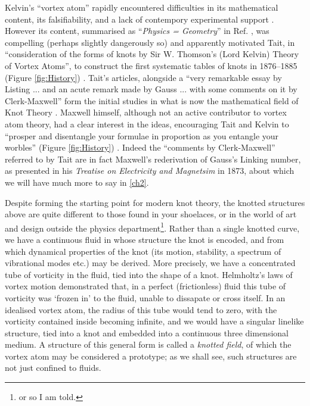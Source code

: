 Kelvin's ``vortex atom'' rapidly encountered difficulties in its mathematical content, its falsifiability, and a lack of contempory experimental support \citep{KelvinMasters}. However its content, summarised as ``\textit{Physics = Geometry}'' in Ref. \citep{KelvinAMS}, was compelling (perhaps slightly dangerously so) and apparently motivated Tait, in ``consideration of the forms of knots by Sir W. Thomson's (Lord Kelvin) Theory of Vortex Atoms'', to construct the first systematic tables of knots in 1876--1885 (Figure \ref{fig:History}) \citep{Tait}. Tait's articles, alongside a ``very remarkable essay by Listing ... and an acute remark made by Gauss ... with some comments on it by Clerk-Maxwell'' \citep{Tait}form the initial studies in  what is now the mathematical field of Knot Theory \cite{Lickorish}. Maxwell himself, although not an active contributor to vortex atom theory, had a clear interest in the ideas, encouraging Tait and Kelvin to ``prosper and disentangle your formulae in proportion as you entangle your worbles'' (Figure \ref{fig:History}) \citep{MaxwellTaitLetter}. Indeed the ``comments by Clerk-Maxwell'' referred to by Tait are in fact Maxwell's rederivation of Gauss's Linking number, as presented in his \textit{Treatise on Electricity and Magnetsim} in 1873, about which we will have much more to say in \ref{ch2}. 

Despite forming the starting point for modern knot theory, the knotted structures above are quite different to those found in your shoelaces, or in the world of art and design outside the physics department\footnote{or so I am told.}. Rather than a single knotted curve, we have a continuous fluid in whose structure the knot is encoded, and from which dynamical properties of the knot (its motion, stability, a spectrum of vibrational modes etc.) may be derived. More precisely, we have a concentrated tube of vorticity in the fluid, tied into the shape of a knot. Helmholtz's laws of vortex motion demonstrated that, in a perfect (frictionless) fluid this tube of vorticity was `frozen in' to the fluid, unable to dissapate or cross itself. In an idealised vortex atom, the radius of this tube would tend to zero, with the vorticity contained inside becoming infinite, and we would have a singular linelike structure, tied into a knot and embedded into a continuous three dimensional medium. A structure of this general form is called a \emph{knotted field}, of which the vortex atom may be considered a prototype; as we shall see, such structures are not just confined to fluids. 


